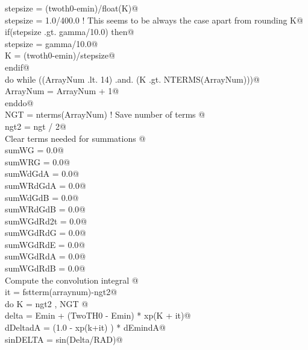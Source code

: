 \documentclass[10pt,a4paper,notitlepage]{article}
\begin{document}
\begin{flushleft}
\begin{list}{}{}
\mbox{}\verb@C        stepsize = (twoth0-emin)/float(K)@\\
\mbox{}\verb@        stepsize = 1.0/400.0 ! This seems to be always the case apart from rounding K@\\
\mbox{}\verb@        if(stepsize .gt. gamma/10.0) then@\\
\mbox{}\verb@           stepsize = gamma/10.0@\\
\mbox{}\verb@           K = (twoth0-emin)/stepsize@\\
\mbox{}\verb@        endif@\\
\mbox{}\verb@        do while ((ArrayNum .lt. 14) .and. (K .gt. NTERMS(ArrayNum)))@\\
\mbox{}\verb@          ArrayNum = ArrayNum + 1@\\
\mbox{}\verb@        enddo@\\
\mbox{}\verb@        NGT = nterms(ArrayNum)              ! Save number of terms @\\
\mbox{}\verb@        ngt2 = ngt / 2@\\
\mbox{}\verb@c Clear terms needed for summations @\\
\mbox{}\verb@        sumWG = 0.0@\\
\mbox{}\verb@        sumWRG = 0.0@\\
\mbox{}\verb@        sumWdGdA = 0.0@\\
\mbox{}\verb@        sumWRdGdA = 0.0@\\
\mbox{}\verb@        sumWdGdB = 0.0@\\
\mbox{}\verb@        sumWRdGdB = 0.0@\\
\mbox{}\verb@        sumWGdRd2t = 0.0@\\
\mbox{}\verb@        sumWGdRdG = 0.0@\\
\mbox{}\verb@        sumWGdRdE = 0.0@\\
\mbox{}\verb@        sumWGdRdA = 0.0@\\
\mbox{}\verb@        sumWGdRdB = 0.0@\\
\mbox{}\verb@c Compute the convolution integral @\\
\mbox{}\verb@        it = fstterm(arraynum)-ngt2@\\
\mbox{}\verb@        do K = ngt2 , NGT @\\
\mbox{}\verb@          delta = Emin + (TwoTH0 - Emin) * xp(K + it)@\\
\mbox{}\verb@          dDeltadA = (1.0 - xp(k+it) ) * dEmindA@\\
\mbox{}\verb@          sinDELTA = sin(Delta/RAD)@\\

\end{list}
\end{flushleft}
\end{document}
